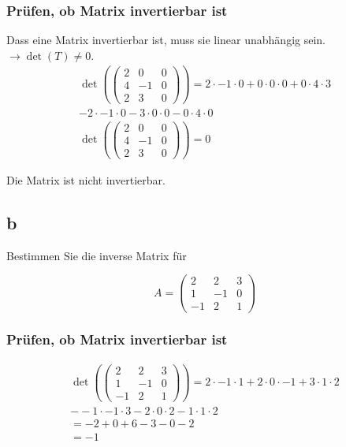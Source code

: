 \subsubsection*{Prüfen, ob Matrix invertierbar ist}
Dass eine Matrix invertierbar ist, muss sie linear unabhängig sein. $\rightarrow \det(T) \neq 0$.
\begin{align*}
    \det\left(\begin{pmatrix}
                  2 & 0  & 0 \\
                  4 & -1 & 0 \\
                  2 & 3  & 0
              \end{pmatrix}\right) = 2 \cdot -1 \cdot 0 + 0 \cdot 0 \cdot 0 + 0 \cdot 4 \cdot 3 \\
    - 2 \cdot -1 \cdot 0 - 3 \cdot 0 \cdot 0 - 0 \cdot 4 \cdot 0                                \\
    \det\left(\begin{pmatrix}
                  2 & 0  & 0 \\
                  4 & -1 & 0 \\
                  2 & 3  & 0
              \end{pmatrix}\right) = 0
\end{align*}

Die Matrix ist nicht invertierbar.

\subsection{b}
Bestimmen Sie die inverse Matrix für

\[
    A = \begin{pmatrix}
        2 & 2 & 3 \\ 1 & -1 & 0 \\ -1 & 2 & 1
    \end{pmatrix}
\]

\subsubsection*{Prüfen, ob Matrix invertierbar ist}

\begin{align*}
    \det\left(
    \begin{pmatrix}
        2  & 2  & 3 \\
        1  & -1 & 0 \\
        -1 & 2  & 1
    \end{pmatrix}
    \right) = 2 \cdot -1 \cdot 1 + 2 \cdot 0 \cdot -1 + 3 \cdot 1 \cdot 2 \\
    - -1 \cdot -1 \cdot 3 - 2 \cdot 0 \cdot 2 - 1 \cdot 1 \cdot 2         \\
    =-2 + 0 + 6 - 3 - 0 - 2                                               \\
    = -1
\end{align*}

